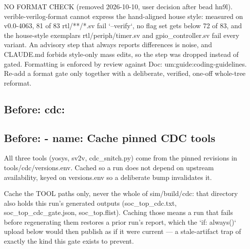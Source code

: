 \begin{record}
\begin{textblock}
NO FORMAT CHECK (removed 2026-10-10, user decision after bead hn9l).
verible-verilog-format cannot express the hand-aligned house style:
measured on v0.0-4063, 81 of 83 rtl/**/*.sv fail `--verify`, no flag set
gets below 72 of 83, and the house-style exemplars rtl/periph/timer.sv and
gpio_controller.sv fail every variant. An advisory step that always reports
differences is noise, and CLAUDE.md forbids style-only mass edits, so the
step was dropped instead of gated. Formatting is enforced by review against
Doc: um:guide:coding-guidelines. Re-add a format gate only together
with a deliberate, verified, one-off whole-tree reformat.
\end{textblock}

\subsection*{Before: cdc:}


\subsection*{Before: - name: Cache pinned CDC tools}

\begin{textblock}
All three tools (yosys, sv2v, cdc_snitch.py) come from the pinned
revisions in tools/cdc/versions.env. Cached so a run does not depend on
upstream availability, keyed on versions.env so a deliberate bump
invalidates it.

Cache the TOOL paths only, never the whole of sim/build/cdc: that
directory also holds this run's generated outputs (soc_top_cdc.txt,
soc_top_cdc_gate.json, soc_top.flist). Caching those means a run that
fails before regenerating them restores a prior run's report, which the
`if: always()` upload below would then publish as if it were current —
a stale-artifact trap of exactly the kind this gate exists to prevent.
\end{textblock}


\end{record}
